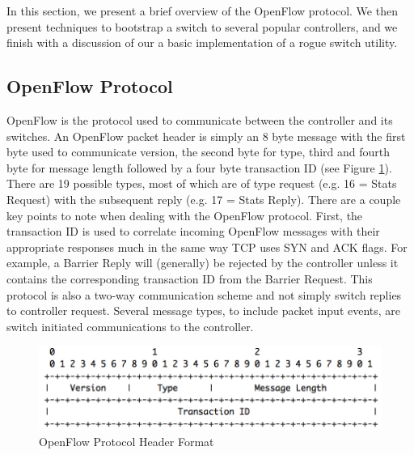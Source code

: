 In this section, we present a brief overview of the OpenFlow protocol. We then present techniques to bootstrap a switch to several popular controllers, and we finish with a discussion of our a basic implementation of a rogue switch utility. 

\subsection {OpenFlow Protocol}
OpenFlow is the protocol used to communicate between the controller and its switches. An OpenFlow packet header is simply an 8 byte message with the first byte used to communicate version, the second byte for type, third and fourth byte for message length followed by a four byte transaction ID (see Figure \ref{fig:protocol}). There are 19 possible types, most of which are of type request (e.g. 16 = Stats Request) with the subsequent reply (e.g. 17 = Stats Reply). There are a couple key points to note when dealing with the OpenFlow protocol. First, the transaction ID is used to correlate incoming OpenFlow messages with their appropriate responses much in the same way TCP uses SYN and ACK flags. For example, a Barrier Reply will (generally) be rejected by the controller unless it contains the corresponding transaction ID from the Barrier Request. This protocol is also a two-way communication scheme and not simply switch replies to controller request. Several message types, to include packet input events, are switch initiated communications to the controller.  

\begin{figure}
  \includegraphics[width=\linewidth]{openflowProtocol.png}
  \caption{OpenFlow Protocol Header Format \cite{protocol}}
  \label{fig:protocol}
\end{figure}

